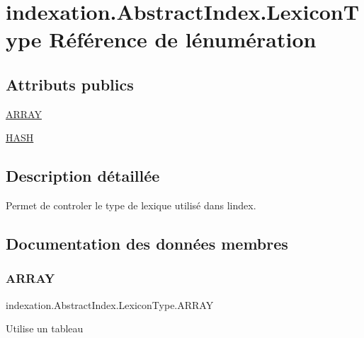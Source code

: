 \hypertarget{enumindexation_1_1AbstractIndex_1_1LexiconType}{}\section{indexation.\+Abstract\+Index.\+Lexicon\+Type Référence de l\textquotesingle{}énumération}
\label{enumindexation_1_1AbstractIndex_1_1LexiconType}
\subsection*{Attributs publics}
\begin{DoxyCompactItemize}
\item 
\hyperlink{enumindexation_1_1AbstractIndex_1_1LexiconType_af673ca51dd9a541868a37abbac3233a7}{A\+R\+R\+AY}
\item 
\hyperlink{enumindexation_1_1AbstractIndex_1_1LexiconType_a904e256414bcbc2263f630560d04375f}{H\+A\+SH}
\end{DoxyCompactItemize}


\subsection{Description détaillée}
Permet de controler le type de lexique utilisé dans l\textquotesingle{}index. 

\subsection{Documentation des données membres}
\mbox{\label{enumindexation_1_1AbstractIndex_1_1LexiconType_af673ca51dd9a541868a37abbac3233a7}} 
\subsubsection{\texorpdfstring{A\+R\+R\+AY}{ARRAY}}
{\footnotesize\ttfamily indexation.\+Abstract\+Index.\+Lexicon\+Type.\+A\+R\+R\+AY}

Utilise un tableau \mbox{\label{enumindexation_1_1AbstractIndex_1_1LexiconType_a904e256414bcbc2263f630560d04375f}} 
